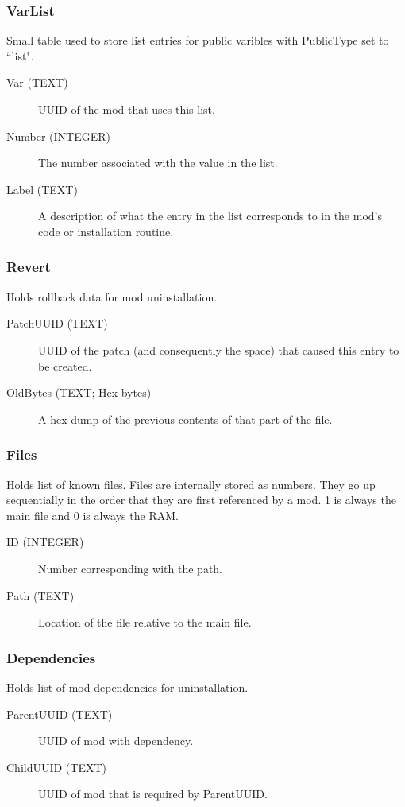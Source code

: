 \subsubsection{VarList}
Small table used to store list entries for public varibles with PublicType set to ``list".

\begin{description}
\item[Var (TEXT)] UUID of the mod that uses this list.
\item[Number (INTEGER)] The number associated with the value in the list.	
\item[Label (TEXT)] A description of what the entry in the list corresponds to in the mod's code or installation routine.
\end{description}

\subsubsection{Revert}
Holds rollback data for mod uninstallation.

\begin{description}
\item[PatchUUID (TEXT)] UUID of the patch (and consequently the space) that caused this entry to be created.
\item[OldBytes (TEXT; Hex bytes)] A hex dump of the previous contents of that part of the file.
\end{description}

\subsubsection{Files}
Holds list of known files. Files are internally stored as numbers. They go up sequentially in the order that they are first referenced by a mod.  1 is always the main file and 0 is always the RAM.

\begin{description}
\item[ID (INTEGER)] Number corresponding with the path.
\item[Path (TEXT)] Location of the file relative to the main file.
\end{description}

\subsubsection{Dependencies}
Holds list of mod dependencies for uninstallation.

\begin{description}
\item[ParentUUID (TEXT)] UUID of mod with dependency.
\item[ChildUUID (TEXT)] UUID of mod that is required by ParentUUID.
\end{description}
